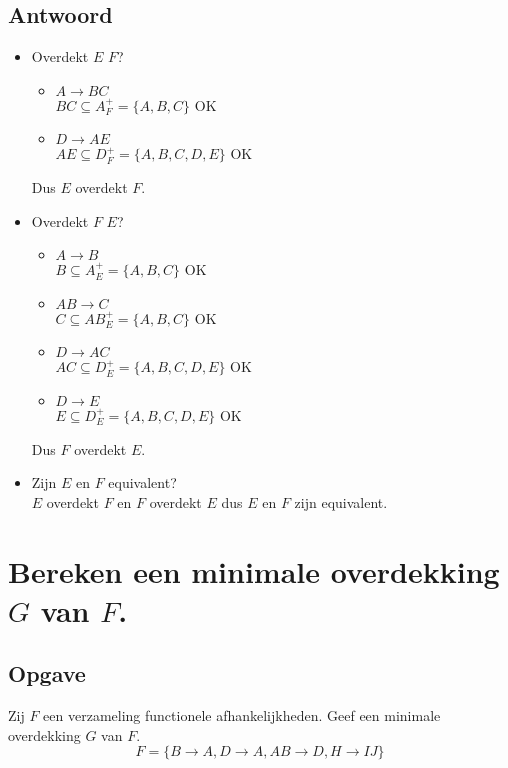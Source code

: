 \documentclass[normaalvormen.tex]{subfiles}
\begin{document}
\subsection{Antwoord}
\begin{itemize}
\item Overdekt $E$ $F$?
\begin{itemize}
\item $A \rightarrow BC$\\
$BC \subseteq A_{F}^{+} = \{A,B,C\}$ OK
\item $D\rightarrow AE$\\
$AE \subseteq D_{F}^{+} = \{A,B,C,D,E\}$ OK
\end{itemize}
Dus $E$ overdekt $F$.
\item Overdekt $F$ $E$?\\
\begin{itemize}
\item $A\rightarrow B$\\
$B \subseteq A_{E}^{+} = \{A,B,C\}$ OK
\item $AB\rightarrow C$\\
$C \subseteq AB_{E}^{+} = \{A,B,C\}$ OK
\item $D\rightarrow AC$\\
$AC \subseteq D_{E}^{+} = \{A,B,C,D,E\}$ OK
\item $D\rightarrow E$\\
$E \subseteq D_{E}^{+} = \{A,B,C,D,E\}$ OK
\end{itemize}
Dus $F$ overdekt $E$.
\item Zijn $E$ en $F$ equivalent?\\
$E$ overdekt $F$ en $F$ overdekt $E$ dus $E$ en $F$ zijn equivalent.
\end{itemize}

\section{Bereken een minimale overdekking $G$ van $F$.}
\subsection{Opgave}
Zij $F$ een verzameling functionele afhankelijkheden. Geef een minimale overdekking $G$ van $F$.
\[
F = \{ B\rightarrow A, D\rightarrow A, AB \rightarrow D, H\rightarrow IJ\}
\]
\end{document}
